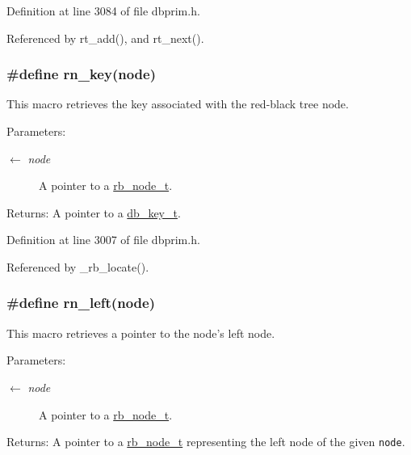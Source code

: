 Definition at line 3084 of file dbprim.h.

Referenced by rt\_\-add(), and rt\_\-next().\hypertarget{group__dbprim__rbtree_ga38}{
\subsubsection[rn\_\-key]{\setlength{\rightskip}{0pt plus 5cm}\#define rn\_\-key(node)}}
\label{group__dbprim__rbtree_ga38}


This macro retrieves the key associated with the red-black tree node.

\begin{Desc}
\item[Parameters:]
\begin{description}
\item[\mbox{$\leftarrow$} {\em node}]A pointer to a \hyperlink{group__dbprim__rbtree_ga1}{rb\_\-node\_\-t}.\end{description}
\end{Desc}
\begin{Desc}
\item[Returns:]A pointer to a \hyperlink{group__dbprim_ga0}{db\_\-key\_\-t}.\end{Desc}


Definition at line 3007 of file dbprim.h.

Referenced by \_\-rb\_\-locate().\hypertarget{group__dbprim__rbtree_ga36}{
\subsubsection[rn\_\-left]{\setlength{\rightskip}{0pt plus 5cm}\#define rn\_\-left(node)}}
\label{group__dbprim__rbtree_ga36}


This macro retrieves a pointer to the node's left node.

\begin{Desc}
\item[Parameters:]
\begin{description}
\item[\mbox{$\leftarrow$} {\em node}]A pointer to a \hyperlink{group__dbprim__rbtree_ga1}{rb\_\-node\_\-t}.\end{description}
\end{Desc}
\begin{Desc}
\item[Returns:]A pointer to a \hyperlink{group__dbprim__rbtree_ga1}{rb\_\-node\_\-t} representing the left node of the given {\tt node}.\end{Desc}


